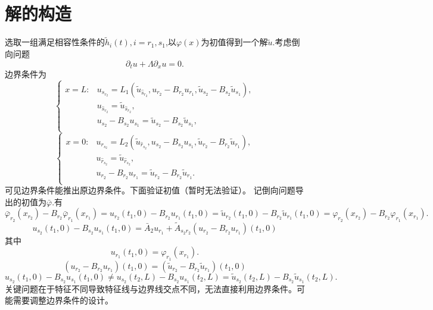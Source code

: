 \documentclass[notitlepage,cs4size,punct,oneside]{ctexrep}
\numberwithin{equation}{chapter}
\theoremstyle{mystyle}
\begin{document}
\section{解的构造}
选取一组满足相容性条件的$\tilde{h}_i(t),i=r_1,s_1$,以$\varphi(x)$为初值得到一个解$\tilde{u}$.考虑倒向问题
$$
\partial _tu+\varLambda \partial _xu=0.
$$
边界条件为
$$
\left\{ \begin{matrix}
	x=L:&		u_{s_{r_2}} =L_1\left( \tilde{u} _{\hat{s} _{r_2}} ,u_{r_2}-B_{r_2}u_{r_1} ,\tilde{u} _{s_2} - B_{s_2}\tilde{u} _{s_1}  \right) ,\\
	&		    u _{\hat{s} _{r_2}} =\tilde{u} _{\hat{s} _{r_2}} ,\\
	&           u_{s_2} - B_{s_2}u_{s_1} =\tilde{u} _{s_2} - B_{s_2}\tilde{u} _{s_1} ,\\
\end{matrix}\right. 
$$
$$
\left\{ \begin{matrix}
	x=0:&	u_{r_{s_2}} =L_2\left(\tilde{ u} _{\hat{r} _{s_2}} ,u_{s_2}-B_{s_2}u_{s_1} ,\tilde{u} _{r_2} - B_{r_2}\tilde{u} _{r_1}  \right), \\
	&		 u _{\hat{r} _{s_2}} =\tilde{u} _{\hat{r} _{s_2}} ,\\
	&           u_{r_2} - B_{r_2}u_{r_1} =\tilde{u} _{r_2} - B_{r_2}\tilde{u} _{r_1} .\\
\end{matrix} \right. 
$$
可见边界条件能推出原边界条件。下面验证初值（暂时无法验证）。
记倒向问题导出的初值为$\bar{\varphi } $.有
$$ 
\bar{\varphi } _{r_2} (x_{r_2})- B_{r_2}\bar{\varphi } _{r_1} (x_{r_1}) = u_{r_2} (t_1 ,0)- B_{r_2}u_{r_1} (t_1 ,0)=\tilde{u} _{r_2} (t_1 ,0)- B_{r_2}\tilde{u} _{r_1} (t_1 ,0)= \varphi  _{r_2} (x_{r_2})- B_{r_2}\varphi _{r_1} (x_{r_1}) .
$$
$$
u_{s_2}(t_1 ,0)-B_{s_2}u_{s_1}(t_1 ,0)=\bar{A}_2 u_{r_1}+\tilde{A}_{s_2r_2}(u_{r_2} - B_{r_2}u_{r_1})(t_1 ,0)
$$
其中
$$
u_{r_1}(t_1 ,0)=\varphi _{r_1} (x_{r_1}) .
$$
$$
(u_{r_2} - B_{r_2}u_{r_1})(t_1 ,0)=(\tilde{u} _{r_2} - B_{r_2}\tilde{u} _{r_1})(t_1 ,0)
$$
$$
u_{s_2}(t_1 ,0)-B_{s_2}u_{s_1}(t_1 ,0) \neq u_{s_2}(t_2 ,L)-B_{s_2}u_{s_1}(t_2 ,L) =\tilde{u} _{s_2}(t_2 ,L)-B_{s_2}\tilde{u} _{s_1}(t_2 ,L) .
$$
关键问题在于特征不同导致特征线与边界线交点不同，无法直接利用边界条件。可能需要调整边界条件的设计。
\end{document}
